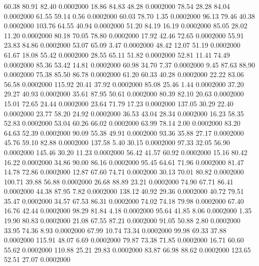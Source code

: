   60.38   80.91   82.40   0.0002000
  18.86   84.83   48.28   0.0002000
  78.54   28.28   84.04   0.0002000
  61.55   59.14    0.56   0.0002000
  60.03   78.70    1.35   0.0002000
  96.13   79.46   40.38   0.0002000
 103.76   64.55   40.94   0.0002000
  51.20   84.19   16.19   0.0002000
  85.05   28.02   11.20   0.0002000
  80.18   70.05   78.80   0.0002000
  17.92   42.46   72.65   0.0002000
  55.91   23.83   84.86   0.0002000
  53.07   65.09    3.47   0.0002000
  48.42   12.07   51.19   0.0002000
  61.67   18.08   55.42   0.0002000
  28.55   65.11   51.82   0.0002000
  52.81   11.41   74.49   0.0002000
  85.36   53.42   14.81   0.0002000
  60.98   34.70    7.37   0.0002000
   9.45   87.63   88.90   0.0002000
  75.38   85.50   86.78   0.0002000
  61.20   60.33   40.28   0.0002000
  22.22   83.06   56.58   0.0002000
 115.92   20.41   37.92   0.0002000
  85.08   25.46    1.44   0.0002000
  37.20   29.27   40.93   0.0002000
  35.61   87.95   50.61   0.0002000
  80.39   82.10   20.63   0.0002000
  15.01   72.65   24.44   0.0002000
  23.64   71.79   17.23   0.0002000
 137.05   30.29   22.40   0.0002000
  23.77   58.20   24.92   0.0002000
  36.53   43.04   28.34   0.0002000
  16.23   58.35   52.83   0.0002000
  53.04   60.26   66.02   0.0002000
  63.99   78.14    2.00   0.0002000
  83.20   64.63   52.39   0.0002000
  90.09   55.38   49.91   0.0002000
  93.36   35.88   27.17   0.0002000
  45.76   59.10   82.88   0.0002000
 137.58    5.40   30.15   0.0002000
  97.33   32.05   56.90   0.0002000
 145.46   30.20   11.23   0.0002000
  56.42   41.57   60.92   0.0002000
  15.16   80.42   16.22   0.0002000
  34.86   90.00   86.16   0.0002000
  95.45   64.61   71.96   0.0002000
  81.47   14.78   72.86   0.0002000
  12.87   67.60   74.71   0.0002000
  30.13   70.01   80.82   0.0002000
 100.71   39.88   56.88   0.0002000
  26.68   88.89   23.21   0.0002000
  74.90   67.71   86.41   0.0002000
  44.38   87.95    7.82   0.0002000
 138.12   40.92   29.36   0.0002000
  40.72   79.51   35.47   0.0002000
  34.57   67.53   86.31   0.0002000
  74.02   74.18   79.98   0.0002000
  67.40   16.76   42.44   0.0002000
  98.29   81.84    4.18   0.0002000
  95.64   41.85    8.06   0.0002000
   1.35   19.90   80.83   0.0002000
  21.08   67.55   87.21   0.0002000
  91.05   50.88    2.80   0.0002000
  33.95   74.36    8.93   0.0002000
  67.99   10.74   73.34   0.0002000
  99.98   69.33   37.88   0.0002000
 115.91   48.07    6.69   0.0002000
  79.87   73.38   71.85   0.0002000
  16.71   60.60   55.62   0.0002000
 110.88   25.21   29.83   0.0002000
  83.87   66.98   88.62   0.0002000
 123.65   52.51   27.07   0.0002000
